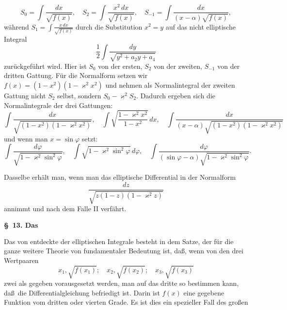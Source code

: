 \[
S_0 = \int \frac{dx}{\sqrt{f(x)}}, \quad S_2 = \int \frac{x^2\,dx}{\sqrt{f(x)}}, \quad S_{-1} = \int \frac{dx}{(x-\alpha)\sqrt{f(x)}},
\]
w\"ahrend $S_1 = \displaystyle\int \frac{x\,dx}{\sqrt{f(x)}}$ durch die Substitution $x^2 = y$ auf das nicht elliptische Integral
\[
\frac{1}{2}\int \frac{dy}{\sqrt{y^2 + a_2 y + a_4}}
\]
zur\"uckgef\"uhrt wird. Hier ist $S_0$ von der ersten, $S_2$ von der zweiten, $S_{-1}$ von der dritten Gattung. F\"ur die  Normalform setzen wir $f(x) = (1-x^2)(1-\varkappa^2 x^2)$ und nehmen als Normalintegral der zweiten Gattung nicht $S_2$ selbst, sondern $S_0 - \varkappa^2 S_2$. Dadurch ergeben sich die Normalintegrale der drei Gattungen:
\[
\int \frac{dx}{\sqrt{(1-x^2)(1-\varkappa^2 x^2)}}, \quad \int \sqrt{\frac{1-\varkappa^2 x^2}{1-x^2}}\,dx, \quad \int \frac{dx}{(x-\alpha)\sqrt{(1-x^2)(1-\varkappa^2 x^2)}}
\]
und wenn man $x = \sin\varphi$ setzt:
\[
\int \frac{d\varphi}{\sqrt{1-\varkappa^2\sin^2\varphi}}, \quad \int \sqrt{1-\varkappa^2\sin^2\varphi}\,d\varphi, \quad \int \frac{d\varphi}{(\sin\varphi - \alpha)\sqrt{1-\varkappa^2\sin^2\varphi}}.
\]

Dasselbe erh\"alt man, wenn man das elliptische Differential in der Normalform
\[
\frac{dz}{\sqrt{z(1-z)(1-\varkappa^2 z)}}
\]
annimmt und nach dem Falle II verf\"ahrt.

\begin{center}
\textbf{\S\ 13. Das }
\end{center}

Das von  entdeckte  der elliptischen Integrale besteht in dem Satze, der f\"ur die ganze weitere Theorie von fundamentaler Bedeutung ist, da\ss, wenn von den drei Wertpaaren
\[
x_1, \sqrt{f(x_1)}; \quad x_2, \sqrt{f(x_2)}; \quad x_3, \sqrt{f(x_3)}
\]
zwei als gegeben vorausgesetzt werden, man auf  das dritte so bestimmen kann, da\ss\ die Differentialgleichung
befriedigt ist. Darin ist $f(x)$ eine gegebene Funktion vom dritten oder vierten Grade. Es ist dies ein spezieller Fall des gro\ss en
